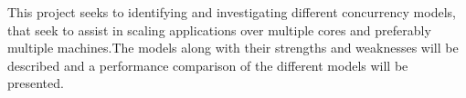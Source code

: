 This project seeks to identifying and investigating different concurrency models, that seek to assist in scaling applications over multiple cores and preferably multiple machines.The models along with their strengths and weaknesses will be described and a performance comparison of the different models will be presented.



 
\worksheetend
